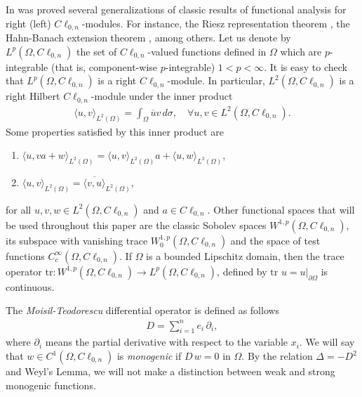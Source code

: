 \documentclass[12pt]{article}
\begin{document}
In \cite{BDS1982} was proved several generalizations of classic results of functional analysis for right (left) $C\ell_{0,n}$-modules. For instance, the Riesz representation theorem \cite[Th.\ 7.6]{BDS1982}, the Hahn-Banach extension theorem \cite[Th.\ 2.10]{BDS1982}, among others.
Let us denote by $L^p(\Omega,C\ell_{0,n})$ the set of $C\ell_{0,n}$-valued functions defined in $\Omega$ which are $p$-integrable (that is, component-wise $p$-integrable) $1<p<\infty$. It is easy to check that $L^p(\Omega,C\ell_{0,n})$ is a right $C\ell_{0,n}$-module. In particular, $L^2(\Omega,C\ell_{0,n})$ is a right Hilbert $C\ell_{0,n}$-module under the inner product
\begin{align}\label{eq:inner-product}
  \langle u,v\rangle_{L^2(\Omega)}=\int_{\Omega}\overline{u} v \, d\sigma, \quad \forall u,v\in L^2(\Omega,C\ell_{0,n}).
\end{align}
Some properties satisfied by this inner product are 
\begin{enumerate}
\item $\langle u,v a+w \rangle_{L^2(\Omega)}=\langle u,v \rangle_{L^2(\Omega)}a + \langle u, w \rangle_{L^2(\Omega)}$,
\item $\langle u,v \rangle_{L^2(\Omega)}=\overline{\langle v,u \rangle}_{L^2(\Omega)}$,
\end{enumerate}
for all $u, v, w \in L^2(\Omega,C\ell_{0,n})$ and $a\in C\ell_{0,n}$. Other functional spaces that will be used throughout this paper are the classic Sobolev spaces $W^{1,p}(\Omega, C\ell_{0,n})$, its subspace with vanishing trace $W_0^{1,p}(\Omega, C\ell_{0,n})$ and the space of test functions $C_{c}^{\infty}(\Omega, C\ell_{0,n})$. If $\Omega$ is a bounded Lipschitz domain, then the trace operator $\text{tr}\colon W^{1,p}(\Omega,C\ell_{0,n})\rightarrow L^p(\Omega,C\ell_{0,n})$, defined by $\text{tr }u=u|_{\partial\Omega}$ is continuous. 
  
The \textit{Moisil-Teodorescu} differential operator is defined as follows
\begin{align}\label{eq:Moisil-Teodorescu}
  D=\sum_{i=1}^n e_i \, \partial_i,
\end{align}
where $\partial_i$ means the partial derivative with respect to the variable $x_i$. We will say that $w\in C^1(\Omega,C\ell_{0,n})$ is \textit{monogenic} if $D\, w=0$ in $\Omega$. By the relation $\Delta=-D^2$ and Weyl's Lemma, we will not make a distinction between weak and strong monogenic functions.
\end{document}
